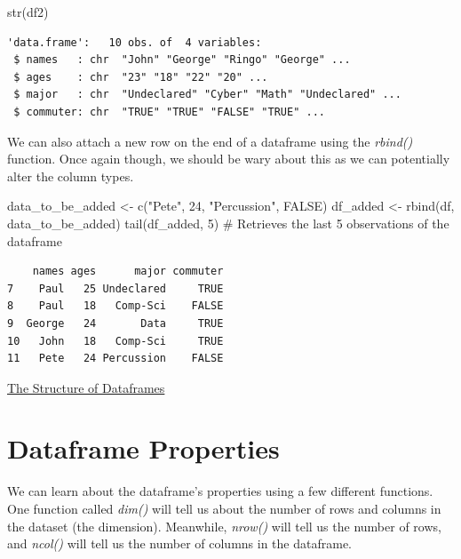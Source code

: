 \documentclass[
  letterpaper,
  DIV=11,
  numbers=noendperiod]{scrreprt}
\newenvironment{Shaded}{\begin{snugshade}}{\end{snugshade}}
\newcommand{\CommentTok}[1]{\textcolor[rgb]{0.37,0.37,0.37}{#1}}
\newcommand{\ConstantTok}[1]{\textcolor[rgb]{0.56,0.35,0.01}{#1}}
\newcommand{\DecValTok}[1]{\textcolor[rgb]{0.68,0.00,0.00}{#1}}
\newcommand{\FunctionTok}[1]{\textcolor[rgb]{0.28,0.35,0.67}{#1}}
\newcommand{\NormalTok}[1]{\textcolor[rgb]{0.00,0.23,0.31}{#1}}
\newcommand{\OtherTok}[1]{\textcolor[rgb]{0.00,0.23,0.31}{#1}}
\newcommand{\StringTok}[1]{\textcolor[rgb]{0.13,0.47,0.30}{#1}}
\begin{document}
\begin{Shaded}
\begin{Highlighting}[]
\FunctionTok{str}\NormalTok{(df2)}
\end{Highlighting}
\end{Shaded}

\begin{verbatim}
'data.frame':   10 obs. of  4 variables:
 $ names   : chr  "John" "George" "Ringo" "George" ...
 $ ages    : chr  "23" "18" "22" "20" ...
 $ major   : chr  "Undeclared" "Cyber" "Math" "Undeclared" ...
 $ commuter: chr  "TRUE" "TRUE" "FALSE" "TRUE" ...
\end{verbatim}

We can also attach a new row on the end of a dataframe using the
\emph{rbind()} function. Once again though, we should be wary about this
as we can potentially alter the column types.

\begin{Shaded}
\begin{Highlighting}[]
\NormalTok{data\_to\_be\_added }\OtherTok{\textless{}{-}} \FunctionTok{c}\NormalTok{(}\StringTok{"Pete"}\NormalTok{, }\DecValTok{24}\NormalTok{, }\StringTok{"Percussion"}\NormalTok{, }\ConstantTok{FALSE}\NormalTok{)}
\NormalTok{df\_added }\OtherTok{\textless{}{-}} \FunctionTok{rbind}\NormalTok{(df, data\_to\_be\_added)}
\FunctionTok{tail}\NormalTok{(df\_added, }\DecValTok{5}\NormalTok{) }\CommentTok{\# Retrieves the last 5 observations of the dataframe}
\end{Highlighting}
\end{Shaded}

\begin{verbatim}
    names ages      major commuter
7    Paul   25 Undeclared     TRUE
8    Paul   18   Comp-Sci    FALSE
9  George   24       Data     TRUE
10   John   18   Comp-Sci     TRUE
11   Pete   24 Percussion    FALSE
\end{verbatim}

\begin{watch}{}{}
    \href{https://youtu.be/0BlLEFou1kM}{The Structure of Dataframes}
\end{watch}

\section{Dataframe Properties}\label{dataframe-properties}

We can learn about the dataframe's properties using a few different
functions. One function called \emph{dim()} will tell us about the
number of rows and columns in the dataset (the dimension). Meanwhile,
\emph{nrow()} will tell us the number of rows, and \emph{ncol()} will
tell us the number of columns in the dataframe.
\end{document}
